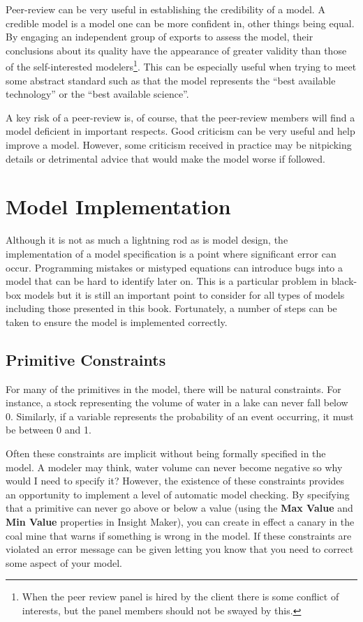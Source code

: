 \documentclass[]{memoir}
\renewcommand{\a}[1]{\textbf{#1}}
\begin{document}
Peer-review can be very useful in establishing the credibility of a
model. A credible model is a model one can be more confident in, other
things being equal. By engaging an independent group of exports to
assess the model, their conclusions about its quality have the
appearance of greater validity than those of the self-interested
modelers\footnote{When the peer review panel is hired by the client
  there is some conflict of interests, but the panel members should not
  be swayed by this.}. This can be especially useful when trying to meet
some abstract standard such as that the model represents the ``best
available technology'' or the ``best available science''.

A key risk of a peer-review is, of course, that the peer-review members
will find a model deficient in important respects. Good criticism can be
very useful and help improve a model. However, some criticism received
in practice may be nitpicking details or detrimental advice that would
make the model worse if followed.

\section{Model Implementation}

Although it is not as much a lightning rod as is model design, the
implementation of a model specification is a point where significant
error can occur. Programming mistakes or mistyped equations can
introduce bugs into a model that can be hard to identify later on. This
is a particular problem in black-box models but it is still an important
point to consider for all types of models including those presented in
this book. Fortunately, a number of steps can be taken to ensure the
model is implemented correctly.

\subsection{Primitive Constraints}

For many of the primitives in the model, there will be natural
constraints. For instance, a stock representing the volume of water in a
lake can never fall below 0. Similarly, if a variable represents the
probability of an event occurring, it must be between 0 and 1.

Often these constraints are implicit without being formally specified in
the model. A modeler may think, water volume can never become negative
so why would I need to specify it? However, the existence of these
constraints provides an opportunity to implement a level of automatic
model checking. By specifying that a primitive can never go above or
below a value (using the \a{Max Value} and \a{Min Value} properties in
Insight Maker), you can create in effect a canary in the coal mine that
warns if something is wrong in the model. If these constraints are
violated an error message can be given letting you know that you need to
correct some aspect of your model.
\end{document}

